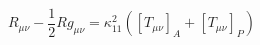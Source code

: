 \begin{equation}
R_{\mu\nu}-\frac{1}{2}Rg_{\mu\nu}
=\kappa_{11}^2\left(\left[T_{\mu\nu}\right]_A+\left[T_{\mu\nu}\right]_P
\right)
\end{equation}

